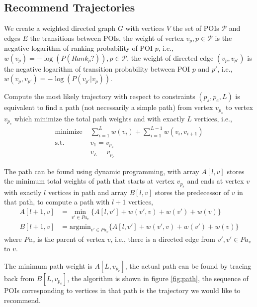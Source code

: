 \documentclass{sig-alternate-05-2015}
\begin{document}
\subsection{Recommend Trajectories}
We create a weighted directed graph $G$ with vertices $V$ the set of POIs $\mathcal{P}$ and 
edges $E$ the transitions between POIs,
the weight of vertex $v_{p}, p \in \mathcal{P}$ is the negative logarithm of ranking probability of POI $p$, 
i.e.,
$w(v_{p}) = -\log(P(Rank_p?)), p \in \mathcal{P}$,
the weight of directed edge $(v_p, v_{p'})$ is the negative logarithm of transition probability between POI $p$ and $p'$,
i.e.,
$w(v_p, v_{p'}) = -\log(P(v_{p'} |v_p))$.

Compute the most likely trajectory with respect to constraints $(p_s, p_e, L)$ is
equivalent to find a path (not necessarily a simple path) from vertex $v_{p_s}$ to
vertex $v_{p_e}$ which minimize the total path weights and with exactly $L$ vertices,
i.e.,
\begin{align*}
    \text{minimize~} & \sum_{i=1}^{L} w(v_i) + \sum_{i=1}^{L-1} w(v_i, v_{i+1}) \\
    \text{s.t.~~~~~} & v_1 = v_{p_s} \\
                     & v_L = v_{p_e} 
\end{align*}
    
The path can be found using dynamic programming, 
with array $A[l, v]$ stores the minimum total weights of path 
that starts at vertex $v_{p_s}$ and ends at vertex $v$ with 
exactly $l$ vertices in path and 
array $B[l, v]$ stores the predecessor of $v$ in that path,
to compute a path with $l+1$ vertices,
\begin{align*}
    A[l+1, v] &= \min_{v' \in Pa_v} \{ A[l, v'] + w(v', v) + w(v') + w(v) \} \\
    B[l+1, v] &= \text{argmin}_{v' \in Pa_v} \{ A[l, v'] + w(v', v) + w(v') + w(v) \} 
\end{align*}
where $Pa_v$ is the parent of vertex $v$, 
i.e., 
there is a directed edge from $v', v' \in Pa_v$ to $v$.

The minimum path weight is $A[L, v_{p_e}]$,
the actual path can be found by tracing back from $B[L, v_{p_e}]$,
the algorithm is shown in figure \ref{fig:path},
the sequence of POIs corresponding to vertices in that path is the 
trajectory we would like to recommend.
\end{document}
